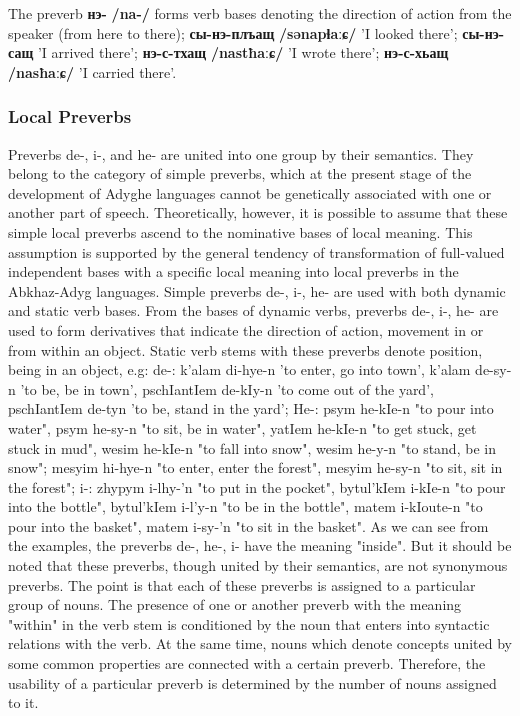 \documentclass[a4paper,12pt]{book}
\newcommand{\1}[1]{\textbf{\emph{#1}}} %
\newcommand{\2}[1]{\textbf{[#1]}} %
\newcommand{\3}[1]{\fontsize{11pt}{0cm}\textbf{\emph{#1}}} %
\newcommand{\4}[1]{\fontsize{10pt}{0cm}\emph{#1}}	%
\newcommand{\5}[1]{\textbf{/#1/}} %
\newcommand{\6}[1]{\textbf{[#1]}} %
\newcommand{\7}[1]{\fontsize{12pt}{0cm}\emph{#1}} %
\newcommand{\8}[1]{\fontsize{12pt}{0cm}`#1'} %
\newcommand{\9}[1]{\fontsize{12pt}{0cm}(lit. `#1')} %
\newcommand{\glossphonemics}[1]{\textbf{/#1/}} %
\begin{document}
The preverb \textbf{нэ-} \glossphonemics{na-} forms verb bases denoting the direction of action from the speaker (from here to there); \textbf{сы-нэ-плъащ} \glossphonemics{sənapɬaːɕ} 'I looked there'; \textbf{сы-нэ-сащ} 'I arrived there'; \textbf{нэ-с-тхащ} \glossphonemics{nastħaːɕ} 'I wrote there'; \textbf{нэ-с-хьащ} \glossphonemics{nasħaːɕ} 'I carried there'.
\subsubsection{Local Preverbs}
Preverbs de-, i-, and he- are united into one group by their semantics. They belong to the category of simple preverbs, which at the present stage of the development of Adyghe languages cannot be genetically associated with one or another part of speech. Theoretically, however, it is possible to assume that these simple local preverbs ascend to the nominative bases of local meaning. This assumption is supported by the general tendency of transformation of full-valued independent bases with a specific local meaning into local preverbs in the Abkhaz-Adyg languages.
Simple preverbs de-, i-, he- are used with both dynamic and static verb bases. From the bases of dynamic verbs, preverbs de-, i-, he- are used to form derivatives that indicate the direction of action, movement in or from within an object. Static verb stems with these preverbs denote position, being in an object, e.g:
de-: k'alam di-hye-n 'to enter, go into town', k'alam de-sy-n 'to be, be in town', pschIantIem de-kIy-n 'to come out of the yard', pschIantIem de-tyn 'to be, stand in the yard';
He-: psym he-kIe-n "to pour into water", psym he-sy-n "to sit, be in water", yatIem he-kIe-n "to get stuck, get stuck in mud", wesim he-kIe-n "to fall into snow", wesim he-y-n "to stand, be in snow"; mesyim hi-hye-n "to enter, enter the forest", mesyim he-sy-n "to sit, sit in the forest";
i-: zhypym i-lhy-'n "to put in the pocket", bytul'kIem i-kIe-n "to pour into the bottle", bytul'kIem i-l'y-n "to be in the bottle", matem i-kIoute-n "to pour into the basket", matem i-sy-'n "to sit in the basket".
As we can see from the examples, the preverbs de-, he-, i- have the meaning "inside". But it should be noted that these preverbs, though united by their semantics, are not synonymous preverbs. The point is that each of these preverbs is assigned to a particular group of nouns. The presence of one or another preverb with the meaning "within" in the verb stem is conditioned by the noun that enters into syntactic relations with the verb. At the same time, nouns which denote concepts united by some common properties are connected with a certain preverb. Therefore, the usability of a particular preverb is determined by the number of nouns assigned to it.
\end{document}
